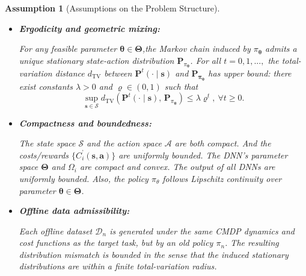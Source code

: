 \documentclass{IEEEtran}
\newtheorem{assumption}{Assumption}
\begin{document}
\begin{assumption}[Assumptions on the Problem Structure]~

\label{assumption:problem_structure}

\begin{itemize}
\item \textbf{Ergodicity and geometric mixing:}

For any feasible parameter $\boldsymbol{\theta}\in\boldsymbol{\Theta}$,the Markov chain induced by $\pi_{\boldsymbol{\theta}}$ admits a unique stationary state-action distribution $\mathbf{P}_{\pi_{\boldsymbol{\theta}}}$. For all $t=0,1,...,$ the total-variation distance $d_{\mathrm{TV}}$ between $\mathbf{P}^{t}(\cdot\mid\boldsymbol{s})$ and $\mathbf{\mathbf{P}_{\pi_{\boldsymbol{\theta}}}}$ has upper bound: there exist constants $\lambda>0$ and $\varrho\in(0,1)$ such that
\[
\sup_{\boldsymbol{s}\in\mathcal{S}}d_{\mathrm{TV}}\!\left(\mathbf{P}^{t}(\cdot\mid\boldsymbol{s}),\,\mathbf{P}_{\pi_{\boldsymbol{\theta}}}\right)\leq\lambda\varrho^{t},\ \forall t\geq0.
\]
\item \textbf{Compactness and boundedness:}

The state space $\mathcal{S}$ and the action space $\mathcal{A}$ are both compact. And the costs/rewards $\{C_{i}^{\text{'}}(\boldsymbol{s},\boldsymbol{a})\}$ are uniformly bounded. The DNN's parameter space $\boldsymbol{\Theta}$ and $\Omega_{i}$ are compact and convex. The output of all DNNs are uniformly bounded. Also, the policy $\pi_{\theta}$ follows Lipschitz continuity over parameter $\boldsymbol{\theta}\in\boldsymbol{\Theta}$. 

\item \textbf{Offline data admissibility:}

Each offline dataset $\mathcal{D}_{n}$ is generated under the same CMDP dynamics and cost functions as the target task, but by an old policy $\pi_{n}$. The resulting distribution mismatch is bounded in the sense that the induced stationary distributions are within a finite total-variation radius.
\end{itemize}
\end{assumption}
\end{document}
